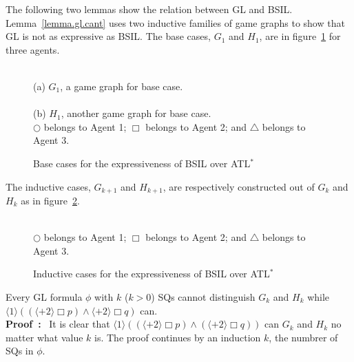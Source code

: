 \documentclass[11pt]{article}
\newcommand{\pf}{\noindent\mbox{\bf Proof : }}
\newcommand{\pfrr}{\Box}
\begin{document}
The following two lemmas show the relation between GL and BSIL.  
Lemma~\ref{lemma.gl.cant} uses two inductive families of game graphs 
to show that GL is not as expressive as BSIL. 
The base cases, $G_1$ and $H_1$, are in figure~\ref{fig.gg.exp}
for three agents.
\begin{figure}[t]\begin{center}
\\
(a) $G_1$, a game graph for base case.\\
\\
(b) $H_1$, another game graph for base case.\\
$\bigcirc$ belongs to Agent  1; $\pfrr$ belongs to Agent 2; and 
$\triangle$ belongs to Agent 3.
\end{center}
\caption{Base cases for the expressiveness of BSIL over ATL$^*$}
\label{fig.gg.exp}
\end{figure}
The inductive cases, $G_{k+1}$ and $H_{k+1}$, are 
respectively constructed out of $G_k$ and $H_k$ as 
in figure~\ref{fig.gg.expi}.
\begin{figure}[t]\begin{center}
\\
$\bigcirc$ belongs to Agent  1; $\pfrr$ belongs to Agent 2; and 
$\triangle$ belongs to Agent 3.
\end{center}
\caption{Inductive cases for the expressiveness of BSIL over ATL$^*$}
\label{fig.gg.expi}
\end{figure}


{\lemma \label{lemma.gl.cant}
Every GL formula $\phi$ with $k$ ($k>0$) SQs cannot distinguish 
$G_k$ and $H_k$ while 
$\langle 1\rangle ((\langle+ 2\rangle\pfrr p)
    \wedge \langle+ 2\rangle\pfrr q)$ can.
}
\\\pf 
It is clear that
$\langle 1\rangle ((\langle+ 2\rangle \pfrr p)
    \wedge (\langle+ 2\rangle \pfrr q))$ can $G_k$ and $H_k$ 
no matter what value $k$ is.  
The proof continues by an induction $k$, the numbrer of SQs in $\phi$. 
\end{document}
